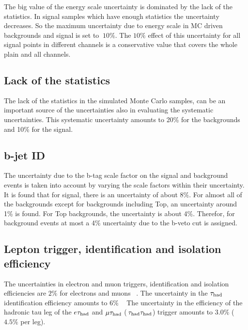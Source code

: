 The big value of the \hadtau energy scale uncertainty is dominated by the lack of the statistics. In signal samples which have enough statistics the uncertainty decreases. So the maximum uncertainty due to \hadtau energy scale in MC driven backgrounds and signal is set to $~10\%$.
The $10\%$ effect of this uncertainty for all signal points in different channels is a conservative value that covers the whole plain and all channels.

\subsection{Lack of the statistics} The lack of the statistics in the simulated Monte Carlo samples, can be an important source of the uncertainties also in evaluating 
the systematic uncertainties. This systematic uncertainty amounts to 20\% for the backgrounds and 10\% for the signal.


\subsection{b-jet ID}
The uncertainty due to the b-tag scale factor on the signal and background events is taken into account by varying the scale factors within their 
uncertainty. It is found that for signal, there is an uncertainty of about $8\%$. For almost all of the backgrounds except for backgrounds including Top, an uncertainty around 1\% is found. For Top backgrounds, the uncertainty is about 4\%. Therefor, for background events at most a 4\% uncertainty due to the b-veto cut is assigned. 
 
\subsection{Lepton trigger, identification and isolation efficiency}
The uncertainties in electron and muon triggers, identification and isolation efficiencies are $2\%$ for electrons and muons ~\cite{CMS_AN_2013-171}. The uncertainty in the $\tau_{\rm had}$ identification efficiency amounts to $6\%$ ~\cite{CMS_AN_2013-171}
The uncertainty in the efficiency of the hadronic tau leg of the $e\tau_{\rm had}$ and $\mu\tau_{\rm had}$ ($\,\tau_{\rm had}\tau_{\rm had}$) trigger amounts to $3.0\%$ ($4.5\%$ per leg).

